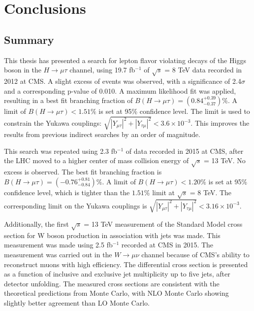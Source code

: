 \documentclass[oneside, letterpaper, oldfontcommands]{memoir}
\begin{document}
\chapter{Conclusions}
\section{Summary}
\qquad This thesis has presented a search for lepton flavor violating decays of the Higgs boson in the $H \rightarrow \mu \tau$ channel, using 19.7 fb$^{-1}$ of $\sqrt{s}$ = 8 TeV data recorded in 2012 at CMS. 
A slight excess of events was observed, with a significance of 2.4$\sigma$ and a corresponding p-value of 0.010. A maximum likelihood fit was applied, 
resulting in a best fit branching fraction of $B(H \rightarrow \mu \tau) = (0.84^{+0.39}_{-0.37})\%$. 
A limit of $B(H\rightarrow \mu\tau) < 1.51\%$ is set at 95\% confidence level. The limit is used to constrain the Yukawa couplings: $\sqrt{|Y_{\mu\tau}|^{2} + |Y_{\tau\mu}|^{2}} < 3.6 \times 10^{-3}$. This improves the results from previous indirect searches by an order of magnitude. 

\qquad This search was repeated using 2.3 fb$^{-1}$ of data recorded in 2015 at CMS, after the LHC moved to a higher center of mass collision energy of $\sqrt{s}$ = 13 TeV. No excess is observed. The best fit branching fraction is $B(H \rightarrow \mu\tau) = (-0.76^{+0.81}_{-0.84})\%$. A limit of $B(H \rightarrow \mu\tau) < 1.20\%$ is set at 95\% confidence level, which is tighter than the $1.51\%$ limit at $\sqrt{s}$ = 8 TeV. The corresponding limit on the Yukawa couplings is $\sqrt{|Y_{\mu\tau}|^{2} + |Y_{\tau\mu}|^{2}} < 3.16 \times 10^{-3}$.

\qquad Additionally, the first $\sqrt{s}$ = 13 TeV measurement of the Standard Model cross section for W boson production in association with jets was made. This measurement was made using 2.5 fb$^{-1}$ recorded at CMS in 2015. The measurement was carried out in the $W \rightarrow \mu \nu$ channel because of CMS's ability to reconstruct muons with high efficiency. The differential cross section is presented as a function of inclusive and exclusive jet multiplicity up to five jets, after detector unfolding. The measured cross sections are consistent with the theoretical predictions from Monte Carlo, with NLO Monte Carlo showing slightly better agreement than LO Monte Carlo.
\end{document}
